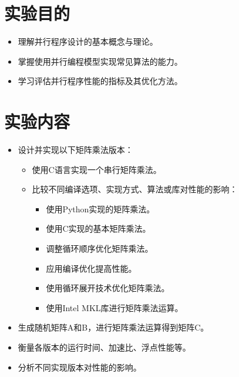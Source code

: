 \documentclass{SYSUReport}
\date{\today}
\begin{document}
\cover
\thispagestyle{empty} %
\clearpage



\section{实验目的}
\begin{itemize}
   \item 理解并行程序设计的基本概念与理论。
    \item 掌握使用并行编程模型实现常见算法的能力。
    \item 学习评估并行程序性能的指标及其优化方法。
\end{itemize}

\section{实验内容}
\begin{itemize}
    \item 设计并实现以下矩阵乘法版本：
    \begin{itemize}
        \item 使用C语言实现一个串行矩阵乘法。
        \item 比较不同编译选项、实现方式、算法或库对性能的影响：
        \begin{itemize}
            \item 使用Python实现的矩阵乘法。
            \item 使用C实现的基本矩阵乘法。
            \item 调整循环顺序优化矩阵乘法。
            \item 应用编译优化提高性能。
            \item 使用循环展开技术优化矩阵乘法。
            \item 使用Intel MKL库进行矩阵乘法运算。
        \end{itemize}
    \end{itemize}
    \item 生成随机矩阵A和B，进行矩阵乘法运算得到矩阵C。
    \item 衡量各版本的运行时间、加速比、浮点性能等。
    \item 分析不同实现版本对性能的影响。
\end{itemize}
\end{document}
